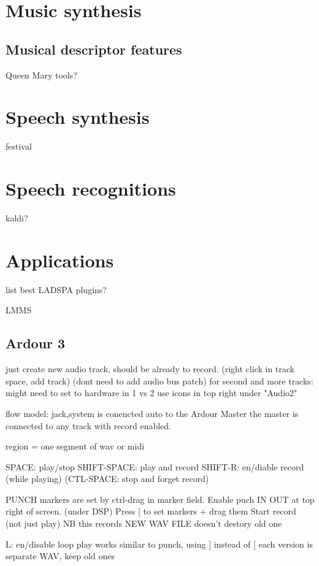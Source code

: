 \documentclass[oneside,english]{scrbook}
\begin{document}
\chapter{Music synthesis}


\section{Musical descriptor features}
Queen Mary tools?
\chapter{Speech synthesis}

festival


\chapter{Speech recognitions}

kaldi?


\chapter{Applications}

list best LADSPA plugins?

LMMS

\section{Ardour 3}

just create new audio track, should be already to record. 
	(right click in track space, add track)
	(dont need to add audio bus patch) 
	for second and more tracks:
		might need to set to hardware in 1 vs 2
			use icons in top right under "Audio2"

flow model:
	jack,system is conencted auto to the Ardour Master
	the master is connected to any track with record enabled.

region = one segment of wav or midi

SPACE: 		play/stop
SHIFT-SPACE:  	play and record  
SHIFT-R:  	en/diable record (while playing)
(CTL-SPACE: 	stop and forget record)

PUNCH markers are set by ctrl-drag in marker field. 
	Enable puch IN OUT at top right of screen. (under DSP) 
	Press [ to set markers + drag them
	Start record (not just play)
	NB this records NEW WAV FILE doesn't destory old one
 
L: 	en/disable loop play
	works similar to punch, using ] instead of [
	each version is separate WAV, keep old ones	
\end{document}

